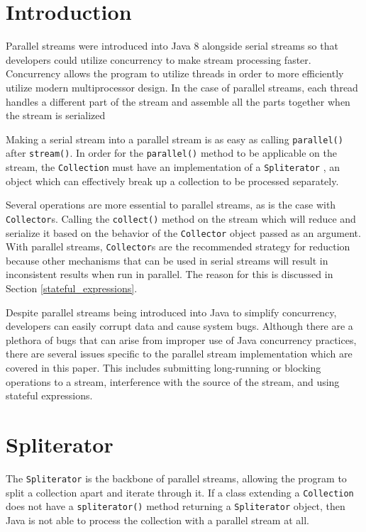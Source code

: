 \documentclass[oneside, 12pt]{article}
\begin{document}
\section{Introduction}
Parallel streams were introduced into Java 8 alongside serial streams so that developers could utilize concurrency to make stream processing faster.  Concurrency allows the program to utilize threads in order to more efficiently utilize modern multiprocessor design. In the case of parallel streams, each thread handles a different part of the stream and assemble all the parts together when the stream is serialized \autocite{parallelism_doc}

Making a serial stream into a parallel stream is as easy as calling \verb|parallel()| after \verb|stream()|. In order for the \verb|parallel()| method to be applicable on the stream, the \verb|Collection| must have an implementation of a \verb|Spliterator| \autocite{ibm_uh_3}, an object which can effectively break up a collection to be processed separately. 

Several operations are more essential to parallel streams, as is the case with \verb|Collector|s. Calling the \verb|collect()| method on the stream which will reduce and serialize it based on the behavior of the \verb|Collector| object passed as an argument. With parallel streams, \verb|Collector|s are the recommended strategy for reduction because other mechanisms that can be used in serial streams will result in inconsistent results when run in parallel. The reason for this is discussed in Section \ref{stateful_expressions}.

Despite parallel streams being introduced into Java to simplify concurrency, developers can easily corrupt data and cause system bugs. Although there are a plethora of bugs that can arise from improper use of Java concurrency practices, there are several issues specific to the parallel stream implementation which are covered in this paper. This includes submitting long-running or blocking operations to a stream, interference with the source of the stream, and using stateful expressions.
\section{Spliterator}
The \verb|Spliterator| is the backbone of parallel streams, allowing the program to split a collection apart and iterate through it. If a class extending a \verb|Collection| does not have a \verb|spliterator()| method returning a \verb|Spliterator| object, then Java is not able to process the collection with a parallel stream at all.
\end{document}
